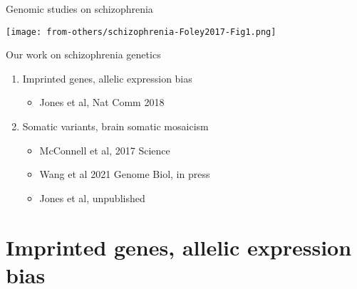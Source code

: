 \documentclass[usenames,dvipsnames]{beamer}
\begin{document}

\begin{frame}{Genomic studies on schizophrenia}
\begin{center}
\texttt{[image: from-others/schizophrenia-Foley2017-Fig1.png]}
\end{center}
\end{frame}

\begin{frame}{Our work on schizophrenia genetics}
\begin{enumerate}
\item Imprinted genes, allelic expression bias
\begin{itemize}
\item Jones et al, Nat Comm 2018
\end{itemize}	
\item Somatic variants, brain somatic mosaicism
\begin{itemize}
\item McConnell et al, 2017 Science
\item Wang et al 2021 Genome Biol, in press
\item Jones et al, unpublished
\end{itemize}
\end{enumerate}
\end{frame}

\section{Imprinted genes, allelic expression bias}
\end{document}
